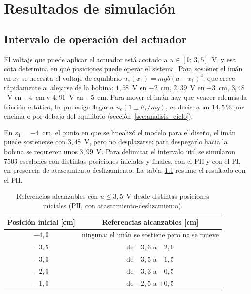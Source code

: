 \chapter{Resultados de simulación}
\label{chap:resultados}

\section{Intervalo de operación del actuador}
\label{sec:intervalo}

El voltaje que puede aplicar el actuador está acotado a $u\in[0;\,3{,}5]$~V, y esa cota determina en qué posiciones puede operar el sistema. Para sostener el imán en $x_1$ se necesita el voltaje de equilibrio $u_e(x_1)=mgb(a-x_1)^4$, que crece rápidamente al alejarse de la bobina: $1{,}58$~V en $-2$~cm, $2{,}39$~V en $-3$~cm, $3{,}48$~V en $-4$~cm y $4{,}91$~V en $-5$~cm. Para mover el imán hay que vencer además la fricción estática, lo que exige llegar a $u_e(1\pm F_s/mg)$, es decir, a un $14{,}5$\,\% por encima o por debajo del equilibrio (sección~\ref{sec:analisis_ciclo}).

En $x_1=-4$~cm, el punto en que se linealizó el modelo para el diseño, el imán puede sostenerse con $3{,}48$~V, pero no desplazarse: para despegarlo hacia la bobina se requieren unos $3{,}99$~V. Para delimitar el intervalo útil se simularon 7503 escalones con distintas posiciones iniciales y finales, con el PII y con el PI, en presencia de atascamiento-deslizamiento. La tabla~\ref{tab:intervalo} resume el resultado con el PII.

\begin{table}[ht]
\centering
\caption{Referencias alcanzables con $u\le3{,}5$~V desde distintas posiciones iniciales (PII, con atascamiento-deslizamiento).}
\label{tab:intervalo}
\begin{tabular}{|c|c|}
\hline
Posición inicial [cm] & Referencias alcanzables [cm] \\ \hline
$-4{,}0$ & ninguna: el imán se sostiene pero no se mueve \\ \hline
$-3{,}5$ & de $-3{,}6$ a $-2{,}0$ \\ \hline
$-3{,}0$ & de $-3{,}5$ a $-1{,}5$ \\ \hline
$-2{,}0$ & de $-3{,}3$ a $-0{,}5$ \\ \hline
$-1{,}0$ & de $-2{,}5$ a $+0{,}5$ \\ \hline
\end{tabular}
\end{table}


